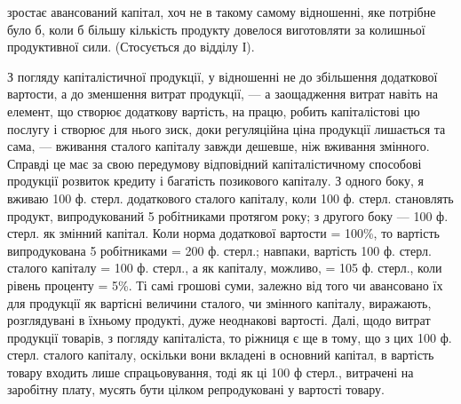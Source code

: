 \parcont{}  %
зростає авансований капітал, хоч не в такому самому відношенні, яке потрібне
було б, коли б більшу кількість продукту довелося виготовляти за колишньої
продуктивної сили. (Стосується до відділу І).

З погляду капіталістичної продукції, у відношенні не до збільшення додаткової
вартости, а до зменшення витрат продукції, — а заощадження витрат
навіть на елемент, що створює додаткову вартість, на працю, робить капіталістові
цю послугу і створює для нього зиск, доки регуляційна ціна продукції
лишається та сама, — вживання сталого капіталу завжди дешевше, ніж
вживання змінного. Справді це має за свою передумову відповідний капіталістичному
способові продукції розвиток кредиту і багатість позикового капіталу. З одного
боку, я вживаю 100 ф. стерл. додаткового сталого капіталу, коли 100 ф.
стерл. становлять продукт, випродукований 5 робітниками протягом року; з
другого боку — 100 ф. стерл. як змінний капітал. Коли норма додаткової вартости
= 100\%, то вартість випродукована 5 робітниками = 200 ф. стерл.;
навпаки, вартість 100 ф. стерл. сталого капіталу = 100 ф. стерл., а як капіталу,
можливо, = 105 ф. стерл., коли рівень проценту = 5\%. Ті самі грошові суми,
залежно від того чи авансовано їх для продукції як вартісні величини сталого,
чи змінного капіталу, виражають, розглядувані в їхньому продукті, дуже неоднакові
вартості. Далі, щодо витрат продукції товарів, з погляду капіталіста,
то ріжниця є ще в тому, що з цих 100 ф. стерл. сталого капіталу, оскільки
вони вкладені в основний капітал, в вартість товару входить лише спрацьовування,
тоді як ці 100 ф стерл., витрачені на заробітну плату, мусять бути
цілком репродуковані у вартості товару.


